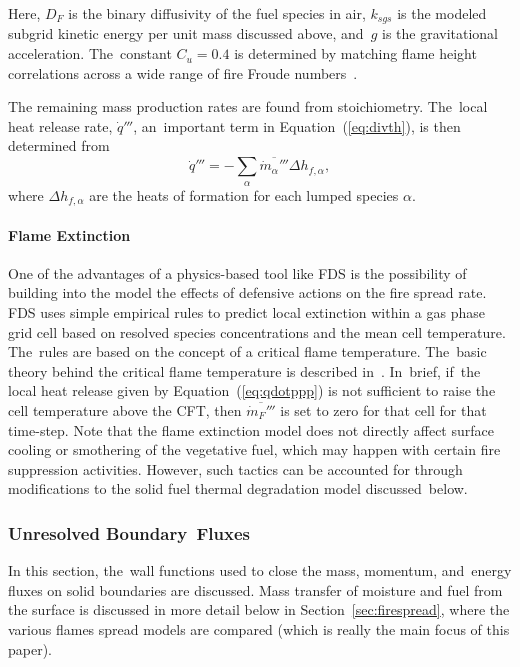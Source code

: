 \documentclass[atmosphere,article,accept,moreauthors,pdftex]{Definitions/mdpi}
\begin{document}
Here, $D_F$ is the binary diffusivity of the fuel species in air, $k_{sgs}$ is the modeled subgrid kinetic energy per unit mass discussed above, and~$g$ is the gravitational acceleration. The~constant $C_u=0.4$ is determined by matching flame height correlations across a wide range of fire Froude numbers~\cite{FDS_MathVal_Guides}.

The remaining mass production rates are found from stoichiometry.  The~local heat release rate, $\dot{q}'''$, an~important term in Equation~(\ref{eq:divth}), is then determined from
\begin{equation}
\label{eq:qdotppp}
\dot{q}''' = - \sum_\alpha \overline{\dot{m}_\alpha'''} \Delta h_{f,\alpha},
\end{equation}
where $\Delta h_{f,\alpha}$ are the heats of formation for each lumped species $\alpha$.

\paragraph{Flame Extinction} One of the advantages of a physics-based tool like FDS is the possibility of building into the model the effects of defensive actions on the fire spread rate.  FDS uses simple empirical rules to predict local extinction within a gas phase grid cell based on resolved species concentrations and the mean cell temperature. The~rules are based on the concept of a critical flame temperature. The~basic theory behind the critical flame temperature is described in~\cite{SFPE:Beyler}.  In~brief, if~the local heat release given by Equation~(\ref{eq:qdotppp}) is not sufficient to raise the cell temperature above the CFT, then $\overline{\dot{m}_{F}'''}$ is set to zero for that cell for that time-step.  Note that the flame extinction model does not directly affect surface cooling or smothering of the vegetative fuel, which may happen with certain fire suppression activities. However, such tactics can be accounted for through modifications to the solid fuel thermal degradation model discussed~below.

\subsubsection{Unresolved Boundary~Fluxes}
\label{sec:boundflx}
In this section, the~wall functions used to close the mass, momentum, and~energy fluxes on solid boundaries are discussed.  Mass transfer of moisture and fuel from the surface is discussed in more detail below in Section~\ref{sec:firespread}, where the various flames spread models are compared (which is really the main focus of this paper).
\end{document}
